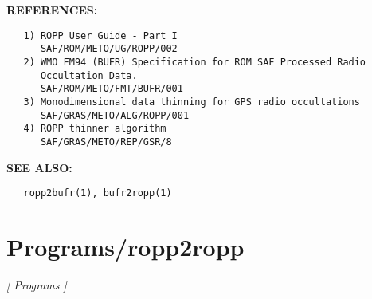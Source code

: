 \textbf{REFERENCES:}\hspace{0.08in}\begin{Verbatim}
   1) ROPP User Guide - Part I
      SAF/ROM/METO/UG/ROPP/002
   2) WMO FM94 (BUFR) Specification for ROM SAF Processed Radio
      Occultation Data.
      SAF/ROM/METO/FMT/BUFR/001
   3) Monodimensional data thinning for GPS radio occultations
      SAF/GRAS/METO/ALG/ROPP/001
   4) ROPP thinner algorithm
      SAF/GRAS/METO/REP/GSR/8
\end{Verbatim}
\textbf{SEE ALSO:}\hspace{0.08in}\begin{Verbatim}
   ropp2bufr(1), bufr2ropp(1)
\end{Verbatim}
\section{Programs/ropp2ropp}
\textsl{[ Programs ]}

